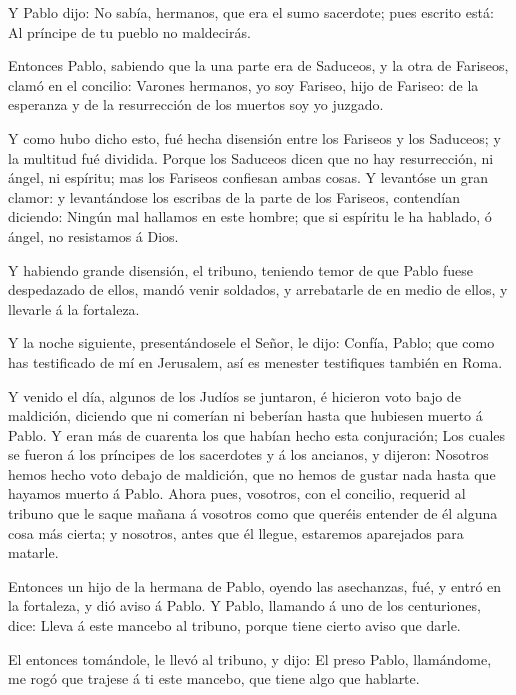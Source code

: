  Y Pablo dijo: No sabía, hermanos, que era el sumo
sacerdote; pues escrito está: Al príncipe de tu pueblo no maldecirás.

 Entonces Pablo, sabiendo que la una parte era de Saduceos,
y la otra de Fariseos, clamó en el concilio: Varones hermanos, yo soy
Fariseo, hijo de Fariseo: de la esperanza y de la resurrección de los
muertos soy yo juzgado.

 Y como hubo dicho esto, fué hecha disensión entre los
Fariseos y los Saduceos; y la multitud fué dividida.  Porque
los Saduceos dicen que no hay resurrección, ni ángel, ni espíritu; mas
los Fariseos confiesan ambas cosas.  Y levantóse un gran
clamor: y levantándose los escribas de la parte de los Fariseos,
contendían diciendo: Ningún mal hallamos en este hombre; que si espíritu
le ha hablado, ó ángel, no resistamos á Dios.

 Y habiendo grande disensión, el tribuno, teniendo temor de
que Pablo fuese despedazado de ellos, mandó venir soldados, y
arrebatarle de en medio de ellos, y llevarle á la fortaleza.

 Y la noche siguiente, presentándosele el Señor, le dijo:
Confía, Pablo; que como has testificado de mí en Jerusalem, así es
menester testifiques también en Roma.

 Y venido el día, algunos de los Judíos se juntaron, é
hicieron voto bajo de maldición, diciendo que ni comerían ni beberían
hasta que hubiesen muerto á Pablo.  Y eran más de cuarenta
los que habían hecho esta conjuración;  Los cuales se
fueron á los príncipes de los sacerdotes y á los ancianos, y dijeron:
Nosotros hemos hecho voto debajo de maldición, que no hemos de gustar
nada hasta que hayamos muerto á Pablo.  Ahora pues,
vosotros, con el concilio, requerid al tribuno que le saque mañana á
vosotros como que queréis entender de él alguna cosa más cierta; y
nosotros, antes que él llegue, estaremos aparejados para matarle.

 Entonces un hijo de la hermana de Pablo, oyendo las
asechanzas, fué, y entró en la fortaleza, y dió aviso á Pablo.
 Y Pablo, llamando á uno de los centuriones, dice: Lleva á
este mancebo al tribuno, porque tiene cierto aviso que darle.

 El entonces tomándole, le llevó al tribuno, y dijo: El
preso Pablo, llamándome, me rogó que trajese á ti este mancebo, que
tiene algo que hablarte.

